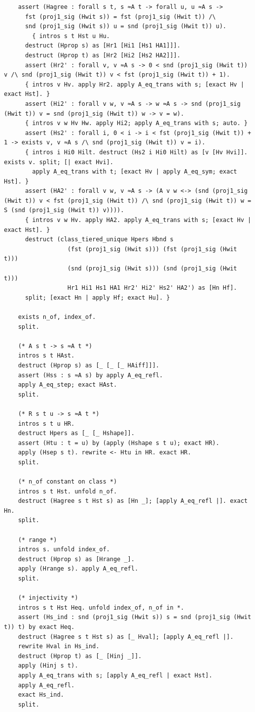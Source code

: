 \begin{latin}
\begin{verbatim}
    assert (Hagree : forall s t, s ≈A t -> forall u, u ≈A s ->
      fst (proj1_sig (Hwit s)) = fst (proj1_sig (Hwit t)) /\
      snd (proj1_sig (Hwit s)) u = snd (proj1_sig (Hwit t)) u).
        { intros s t Hst u Hu.
      destruct (Hprop s) as [Hr1 [Hi1 [Hs1 HA1]]].
      destruct (Hprop t) as [Hr2 [Hi2 [Hs2 HA2]]].
      assert (Hr2' : forall v, v ≈A s -> 0 < snd (proj1_sig (Hwit t)) v /\ snd (proj1_sig (Hwit t)) v < fst (proj1_sig (Hwit t)) + 1).
      { intros v Hv. apply Hr2. apply A_eq_trans with s; [exact Hv | exact Hst]. }
      assert (Hi2' : forall v w, v ≈A s -> w ≈A s -> snd (proj1_sig (Hwit t)) v = snd (proj1_sig (Hwit t)) w -> v = w).
      { intros v w Hv Hw. apply Hi2; apply A_eq_trans with s; auto. }
      assert (Hs2' : forall i, 0 < i -> i < fst (proj1_sig (Hwit t)) + 1 -> exists v, v ≈A s /\ snd (proj1_sig (Hwit t)) v = i).
      { intros i Hi0 Hilt. destruct (Hs2 i Hi0 Hilt) as [v [Hv Hvi]]. exists v. split; [| exact Hvi].
        apply A_eq_trans with t; [exact Hv | apply A_eq_sym; exact Hst]. }
      assert (HA2' : forall v w, v ≈A s -> (A v w <-> (snd (proj1_sig (Hwit t)) v < fst (proj1_sig (Hwit t)) /\ snd (proj1_sig (Hwit t)) w = S (snd (proj1_sig (Hwit t)) v)))).
      { intros v w Hv. apply HA2. apply A_eq_trans with s; [exact Hv | exact Hst]. }
      destruct (class_tiered_unique Hpers Hbnd s
                  (fst (proj1_sig (Hwit s))) (fst (proj1_sig (Hwit t)))
                  (snd (proj1_sig (Hwit s))) (snd (proj1_sig (Hwit t)))
                  Hr1 Hi1 Hs1 HA1 Hr2' Hi2' Hs2' HA2') as [Hn Hf].
      split; [exact Hn | apply Hf; exact Hu]. }

    exists n_of, index_of.
    split.

    (* A s t -> s ≈A t *)
    intros s t HAst.
    destruct (Hprop s) as [_ [_ [_ HAiff]]].
    assert (Hss : s ≈A s) by apply A_eq_refl.
    apply A_eq_step; exact HAst.
    split.

    (* R s t u -> s ≈A t *)
    intros s t u HR.
    destruct Hpers as [_ [_ Hshape]].
    assert (Htu : t = u) by (apply (Hshape s t u); exact HR).
    apply (Hsep s t). rewrite <- Htu in HR. exact HR.
    split.

    (* n_of constant on class *)
    intros s t Hst. unfold n_of.
    destruct (Hagree s t Hst s) as [Hn _]; [apply A_eq_refl |]. exact Hn.
    split.

    (* range *)
    intros s. unfold index_of.
    destruct (Hprop s) as [Hrange _].
    apply (Hrange s). apply A_eq_refl.
    split.

    (* injectivity *)
    intros s t Hst Heq. unfold index_of, n_of in *.
    assert (Hs_ind : snd (proj1_sig (Hwit s)) s = snd (proj1_sig (Hwit t)) t) by exact Heq.
    destruct (Hagree s t Hst s) as [_ Hval]; [apply A_eq_refl |].
    rewrite Hval in Hs_ind.
    destruct (Hprop t) as [_ [Hinj _]].
    apply (Hinj s t).
    apply A_eq_trans with s; [apply A_eq_refl | exact Hst].
    apply A_eq_refl.
    exact Hs_ind.
    split.


\end{verbatim}
\end{latin}
